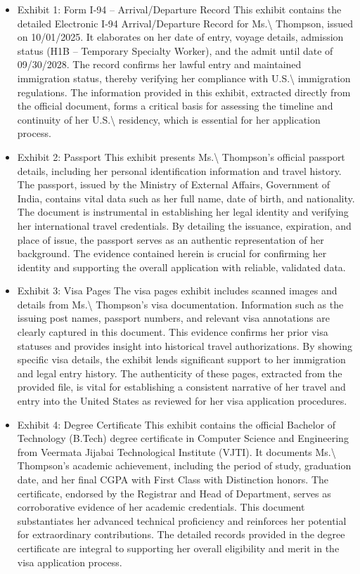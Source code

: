 \begin{itemize}

\item Exhibit 1: Form I‑94 – Arrival/Departure Record
  This exhibit contains the detailed Electronic I‑94 Arrival/Departure Record for Ms.\textbackslash{} Thompson, issued on 10/01/2025. It elaborates on her date of entry, voyage details, admission status (H1B – Temporary Specialty Worker), and the admit until date of 09/30/2028. The record confirms her lawful entry and maintained immigration status, thereby verifying her compliance with U.S.\textbackslash{} immigration regulations. The information provided in this exhibit, extracted directly from the official document, forms a critical basis for assessing the timeline and continuity of her U.S.\textbackslash{} residency, which is essential for her application process.

\item Exhibit 2: Passport
  This exhibit presents Ms.\textbackslash{} Thompson’s official passport details, including her personal identification information and travel history. The passport, issued by the Ministry of External Affairs, Government of India, contains vital data such as her full name, date of birth, and nationality. The document is instrumental in establishing her legal identity and verifying her international travel credentials. By detailing the issuance, expiration, and place of issue, the passport serves as an authentic representation of her background. The evidence contained herein is crucial for confirming her identity and supporting the overall application with reliable, validated data.

\item Exhibit 3: Visa Pages
  The visa pages exhibit includes scanned images and details from Ms.\textbackslash{} Thompson’s visa documentation. Information such as the issuing post names, passport numbers, and relevant visa annotations are clearly captured in this document. This evidence confirms her prior visa statuses and provides insight into historical travel authorizations. By showing specific visa details, the exhibit lends significant support to her immigration and legal entry history. The authenticity of these pages, extracted from the provided file, is vital for establishing a consistent narrative of her travel and entry into the United States as reviewed for her visa application procedures.

\item Exhibit 4: Degree Certificate
  This exhibit contains the official Bachelor of Technology (B.Tech) degree certificate in Computer Science and Engineering from Veermata Jijabai Technological Institute (VJTI). It documents Ms.\textbackslash{} Thompson’s academic achievement, including the period of study, graduation date, and her final CGPA with First Class with Distinction honors. The certificate, endorsed by the Registrar and Head of Department, serves as corroborative evidence of her academic credentials. This document substantiates her advanced technical proficiency and reinforces her potential for extraordinary contributions. The detailed records provided in the degree certificate are integral to supporting her overall eligibility and merit in the visa application process.

\end{itemize}